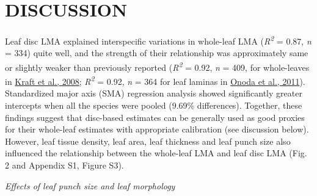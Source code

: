 \documentclass[
  12pt,
  a4paper,
,tablecaptionabove
]{scrartcl}
\begin{document}
\hypertarget{discussion}{%
\section{DISCUSSION}\label{discussion}}

Leaf disc LMA explained interspecific variations in whole-leaf LMA (\emph{R\textsuperscript{2}} = 0.87, \emph{n} = 334) quite well, and the strength of their relationship was approximately same or slightly weaker than previously reported (\emph{R\textsuperscript{2}} = 0.92, \emph{n} = 409, for whole-leaves in \protect\hyperlink{ref-Kraft2008}{Kraft et al., 2008}; \emph{R\textsuperscript{2}} = 0.92, \emph{n} = 364 for leaf laminas in \protect\hyperlink{ref-Onoda2011}{Onoda et al., 2011}).
Standardized major axis (SMA) regression analysis showed significantly greater intercepts when all the species were pooled (9.69\% differences).
Together, these findings suggest that disc-based estimates can be generally used as good proxies for their whole-leaf estimates with appropriate calibration (see discussion below).
However, leaf tissue density, leaf area, leaf thickness and leaf punch size also influenced the relationship between the whole-leaf LMA and leaf disc LMA (Fig. 2 and Appendix S1, Figure S3).

\emph{Effects of leaf punch size and leaf morphology}
\end{document}
